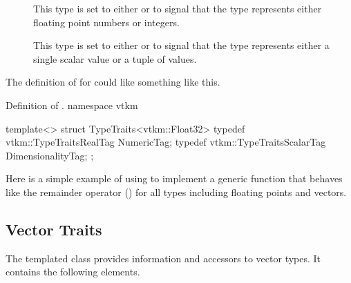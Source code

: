 \begin{description}
\item[]  
  This type is set to either  or
   to signal that the type represents either
  floating point numbers or integers.
\item[] 
   This type is set to either
   or  to signal that
  the type represents either a single scalar value or a tuple of values.
\end{description}

The definition of  for  could like something
like this.
\begin{vtkmexample}{Definition of \protect {}.}
namespace vtkm {

template<>
struct TypeTraits<vtkm::Float32>
{
  typedef vtkm::TypeTraitsRealTag NumericTag;
  typedef vtkm::TypeTraitsScalarTag DimensionalityTag;
};

}
\end{vtkmexample}

Here is a simple example of using  to implement a generic
function that behaves like the remainder operator (\textcode{\%}) for all
types including floating points and vectors.





\subsection{Vector Traits}

The  templated class provides information and
accessors to vector types. It contains the following elements.


